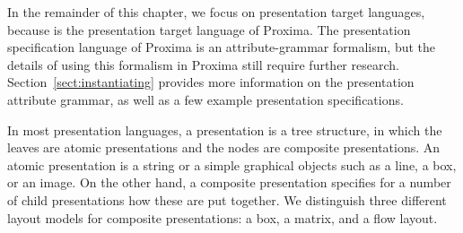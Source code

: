 In the remainder of this chapter, we focus on presentation target languages, because {\Xprez} is the presentation target language of Proxima. The presentation specification language of Proxima is an attribute-grammar formalism, but the details of using this formalism in Proxima still require further research. Section~\ref{sect:instantiating} provides more information on the presentation attribute grammar, as well as a few example presentation specifications. 

In most presentation languages, a presentation is a tree structure, in which the leaves are atomic presentations and the nodes are composite presentations. An atomic presentation is a string or a simple graphical objects such as a line, a box, or an image. On the other hand, a composite presentation specifies for a number of child presentations how these are put together. We distinguish three different layout models for composite presentations: a box, a matrix, and a flow layout.


